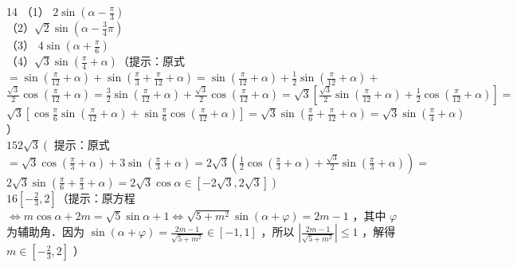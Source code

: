 \documentclass[10pt]{article}
\begin{document}
14 （1） \(2 \sin \left(\alpha-\frac{\pi}{3}\right)\)\\
（2）\(\sqrt{2} \sin \left(\alpha-\frac{3}{4} \pi\right)\)\\
（3） \(4 \sin \left(\alpha+\frac{\pi}{6}\right)\)\\
（4）\(\sqrt{3} \sin \left(\frac{\pi}{4}+\alpha\right)\)（提示：原式 \(=\sin \left(\frac{\pi}{12}+\alpha\right)+\sin \left(\frac{\pi}{3}+\frac{\pi}{12}+\alpha\right)=\sin \left(\frac{\pi}{12}+\alpha\right)+\frac{1}{2} \sin \left(\frac{\pi}{12}+\alpha\right)+\) \(\frac{\sqrt{3}}{2} \cos \left(\frac{\pi}{12}+\alpha\right)=\frac{3}{2} \sin \left(\frac{\pi}{12}+\alpha\right)+\frac{\sqrt{3}}{2} \cos \left(\frac{\pi}{12}+\alpha\right)=\sqrt{3}\left[\frac{\sqrt{3}}{2} \sin \left(\frac{\pi}{12}+\alpha\right)+\frac{1}{2} \cos \left(\frac{\pi}{12}+\alpha\right)\right]=\) \(\sqrt{3}\left[\cos \frac{\pi}{6} \sin \left(\frac{\pi}{12}+\alpha\right)+\sin \frac{\pi}{6} \cos \left(\frac{\pi}{12}+\alpha\right)\right]=\sqrt{3} \sin \left(\frac{\pi}{6}+\frac{\pi}{12}+\alpha\right)=\sqrt{3} \sin \left(\frac{\pi}{4}+\alpha\right)\) ）\\
\(152 \sqrt{3}\left(\right.\) 提示：原式 \(=\sqrt{3} \cos \left(\frac{\pi}{3}+\alpha\right)+3 \sin \left(\frac{\pi}{3}+\alpha\right)=2 \sqrt{3}\left(\frac{1}{2} \cos \left(\frac{\pi}{3}+\alpha\right)+\frac{\sqrt{3}}{2} \sin \left(\frac{\pi}{3}+\alpha\right)\right)=\) \(\left.2 \sqrt{3} \sin \left(\frac{\pi}{6}+\frac{\pi}{3}+\alpha\right)=2 \sqrt{3} \cos \alpha \in[-2 \sqrt{3}, 2 \sqrt{3}]\right)\)\\
\(16\left[-\frac{2}{3}, 2\right]\)（提示：原方程 \(\Leftrightarrow m \cos \alpha+2 m=\sqrt{5} \sin \alpha+1 \Leftrightarrow \sqrt{5+m^{2}} \sin (\alpha+\varphi)=2 m-1\) ，其中 \(\varphi\) 为辅助角．因为 \(\sin (\alpha+\varphi)=\frac{2 m-1}{\sqrt{5+m^{2}}} \in[-1,1]\) ，所以 \(\left|\frac{2 m-1}{\sqrt{5+m^{2}}}\right| \leqslant 1\) ，解得 \(m \in\left[-\frac{2}{3}, 2\right]\) ）
\end{document}
